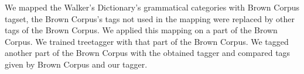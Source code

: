 We mapped the Walker's Dictionary's grammatical categories with Brown Corpus tagset, 
the Brown Corpus's tags not used in the mapping were replaced by other tags of the Brown Corpus.
We applied this mapping on a part of the Brown Corpus.
We trained treetagger with that part of the Brown Corpus.
We tagged another part of the Brown Corpus with the obtained tagger and compared tags given by Brown Corpus and our tagger.